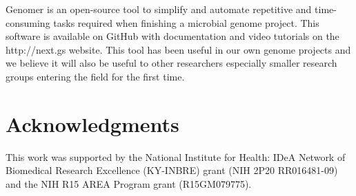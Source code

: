\documentclass[10pt]{article}
\begin{document}
Genomer is an open-source tool to simplify and automate repetitive and
time-consuming tasks required when finishing a microbial genome project. This
software is available on GitHub \cite{genomer-github} with documentation and
video tutorials on the http://next.gs website. This tool has been useful in our
own genome projects and we believe it will also be useful to other researchers
especially smaller research groups entering the field for the first time.

\section*{Acknowledgments}

This work was supported by the National Institute for Health: IDeA Network of
Biomedical Research Excellence (KY-INBRE) grant (NIH 2P20 RR016481-09) and the
NIH R15 AREA Program grant (R15GM079775).


\end{document}
